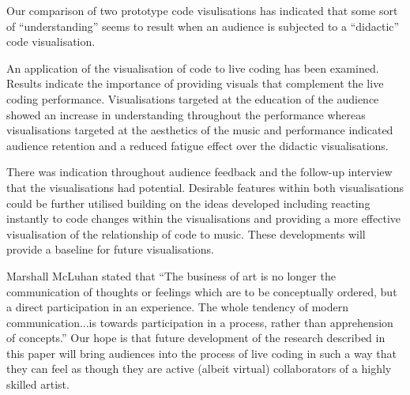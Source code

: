 \documentclass{sig-alternate}
\begin{document}
Our comparison of two prototype code visulisations has indicated that some sort of ``understanding'' seems to result when an audience is subjected to a ``didactic'' code visualisation. 

An application of the visualisation of code to live coding has been examined. Results indicate the importance of providing visuals that complement the live coding performance. Visualisations targeted at the education of the audience showed an increase in understanding throughout the performance whereas visualisations targeted at the aesthetics of the music and performance indicated audience retention and a reduced fatigue effect over the didactic visualisations.

There was indication throughout audience feedback and the follow-up interview that the visualisations had potential. Desirable features within both visualisations could be further utilised building on the ideas developed including reacting instantly to code changes within the visualisations and providing a more effective visualisation of the relationship of code to music. These developments will provide a baseline for future visualisations.

Marshall McLuhan stated that ``The business of art is no longer the communication of thoughts or feelings which are to be conceptually ordered, but a direct participation in an experience. The whole tendency of modern communication...is towards participation in a process, rather than apprehension of concepts.'' \cite{McLuhan} Our hope is that future development of the research described in this paper will bring audiences into the process of live coding in such a way that they can feel as though they are active (albeit virtual) collaborators of a highly skilled artist.




%

\end{document}
